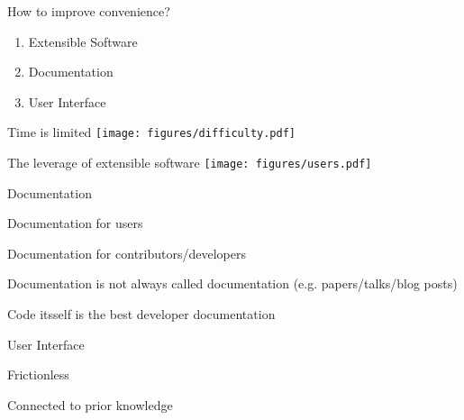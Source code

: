 \documentclass{beamer}
\newenvironment{wideitemize}{
    \itemize\addtolength{\itemsep}{15pt}\addtolength{\topsep}{10pt}}{\enditemize}
\begin{document}
    \begin{frame}{How to improve convenience?}
      \begin{enumerate}
        \item Extensible Software
        \item Documentation
        \item User Interface
      \end{enumerate}
    \end{frame}
    
    \begin{frame}[c]{Time is limited}
      \centering
      \texttt{[image: figures/difficulty.pdf]}
    \end{frame}
    
    \begin{frame}[c]{The leverage of extensible software}
      \centering
      \texttt{[image: figures/users.pdf]}
    \end{frame}

    \begin{frame}{Documentation}
      \begin{wideitemize}
        \item Documentation for users
        \item Documentation for contributors/developers
        \item<2-> Documentation is not always called documentation (e.g. papers/talks/blog posts)
                \item<3> Code itsself is the best developer documentation
      \end{wideitemize}
    \end{frame}

    \begin{frame}{User Interface}
      \begin{wideitemize}
        \item Frictionless
        \item Connected to prior knowledge
      \end{wideitemize}
    \end{frame}
    
    \begin{frame}[c]
    \end{frame}
\end{document}
